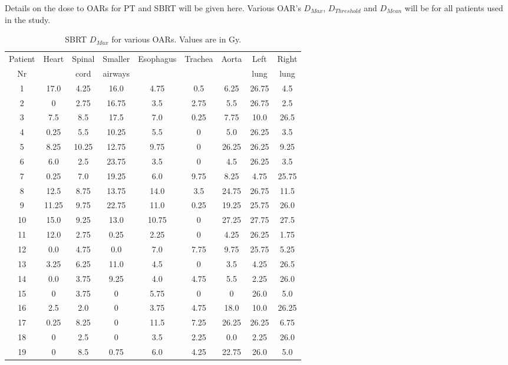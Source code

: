 Details on the dose to OARs for PT and SBRT will be given here. Various OAR's $D_{Max}$, $D_{Threshold}$ and $D_{Mean}$ will be for all patients used in the study.

\begin{table}[H]
  \centering
  \caption{SBRT $D_{Max}$ for various OARs. Values are in Gy.}
  \begin{tabular}{c|c|c|c|c|c|c|c|c}
   Patient & \multirow{2}{*}{Heart} & Spinal  & Smaller  & \multirow{2}{*}{Esophagus} & \multirow{2}{*}{Trachea} & \multirow{2}{*}{Aorta} & Left  & Right \\
   Nr & & cord & airways & & & & lung & lung \\
 \hline\hline 
1 & 17.0 & 4.25 & 16.0 & 4.75 & 0.5 & 6.25 & 26.75 & 4.5\\
2 & 0 & 2.75 & 16.75 & 3.5 & 2.75 & 5.5 & 26.75 & 2.5\\
3 & 7.5 & 8.5 & 17.5 & 7.0 & 0.25 & 7.75 & 10.0 & 26.5\\
4 & 0.25 & 5.5 & 10.25 & 5.5 & 0 & 5.0 & 26.25 & 3.5\\
5 & 8.25 & 10.25 & 12.75 & 9.75 & 0 & 26.25 & 26.25 & 9.25\\
6 & 6.0 & 2.5 & 23.75 & 3.5 & 0 & 4.5 & 26.25 & 3.5\\
7 & 0.25 & 7.0 & 19.25 & 6.0 & 9.75 & 8.25 & 4.75 & 25.75\\
8 & 12.5 & 8.75 & 13.75 & 14.0 & 3.5 & 24.75 & 26.75 & 11.5\\
9 & 11.25 & 9.75 & 22.75 & 11.0 & 0.25 & 19.25 & 25.75 & 26.0\\
10 & 15.0 & 9.25 & 13.0 & 10.75 & 0 & 27.25 & 27.75 & 27.5\\
11 & 12.0 & 2.75 & 0.25 & 2.25 & 0 & 4.25 & 26.25 & 1.75\\
12 & 0.0 & 4.75 & 0.0 & 7.0 & 7.75 & 9.75 & 25.75 & 5.25\\
13 & 3.25 & 6.25 & 11.0 & 4.5 & 0 & 3.5 & 4.25 & 26.5\\
14 & 0.0 & 3.75 & 9.25 & 4.0 & 4.75 & 5.5 & 2.25 & 26.0\\
15 & 0 & 3.75 & 0 & 5.75 & 0 & 0 & 26.0 & 5.0\\
16 & 2.5 & 2.0 & 0 & 3.75 & 4.75 & 18.0 & 10.0 & 26.25\\
17 & 0.25 & 8.25 & 0 & 11.5 & 7.25 & 26.25 & 26.25 & 6.75\\
18 & 0 & 2.5 & 0 & 3.5 & 2.25 & 0.0 & 2.25 & 26.0\\
19 & 0 & 8.5 & 0.75 & 6.0 & 4.25 & 22.75 & 26.0 & 5.0\\
\hline\hline
  \end{tabular}
  \label{tab:oarlimits2}
\end{table}
